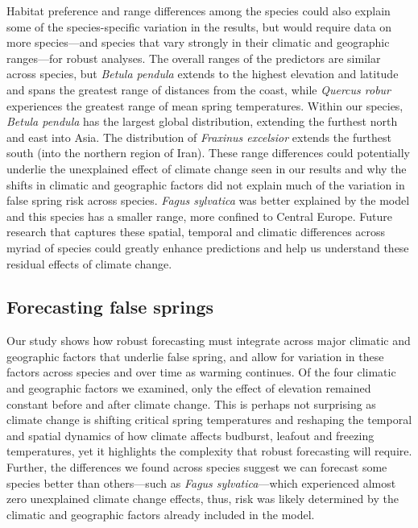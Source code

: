 \documentclass{article}\usepackage[]{graphicx}\usepackage[]{color}
\begin{document}
Habitat preference and range differences among the species could also explain some of the species-specific variation in the results, but would require data on more species---and species that vary strongly in their climatic and geographic ranges---for robust analyses. The overall ranges of the predictors are similar across species, but \textit{Betula pendula} extends to the highest elevation and latitude and spans the greatest range of distances from the coast, while \textit{Quercus robur} experiences the greatest range of mean spring temperatures. Within our species, \textit{Betula pendula} has the largest global distribution, extending the furthest north and east into Asia. The distribution of \textit{Fraxinus excelsior} extends the furthest south (into the northern region of Iran). These range differences could potentially underlie the unexplained effect of climate change seen in our results and why the shifts in climatic and geographic factors did not explain much of the variation in false spring risk across species. \textit{Fagus sylvatica} was better explained by the model and this species has a smaller range, more confined to Central Europe. Future research that captures these spatial, temporal and climatic differences across myriad of species could greatly enhance predictions and help us understand these residual effects of climate change.  

\subsection*{Forecasting false springs}
Our study shows how robust forecasting must integrate across major climatic and geographic factors that underlie false spring, and allow for variation in these factors across species and over time as warming continues. Of the four climatic and geographic factors we examined, only the effect of elevation remained constant before and after climate change. This is perhaps not surprising as climate change is shifting critical spring temperatures and reshaping the temporal and spatial dynamics of how climate affects budburst, leafout and freezing temperatures, yet it highlights the complexity that robust forecasting will require. Further, the differences we found across species suggest we can forecast some species better than others---such as \textit{Fagus sylvatica}---which experienced almost zero unexplained climate change effects, thus, risk was likely determined by the climatic and geographic factors already included in the model. %
\end{document}
